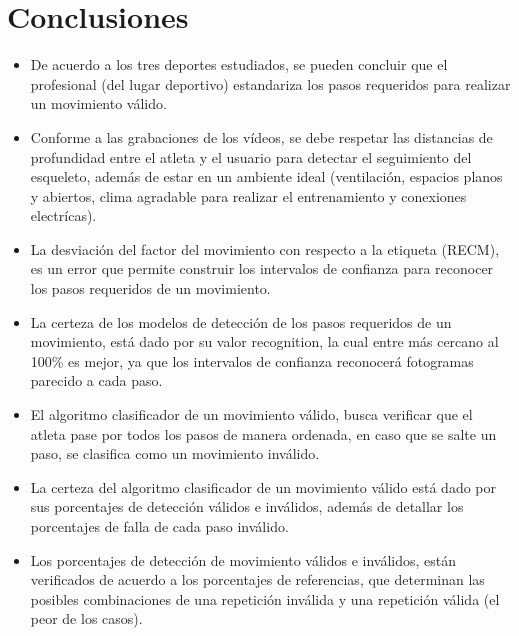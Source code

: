 \section{Conclusiones} \label{ded:con}
\begin{itemize}
\item De acuerdo a los tres deportes estudiados, se pueden concluir que el profesional (del lugar deportivo) estandariza los pasos requeridos para realizar un movimiento v\'alido.
\item Conforme a las grabaciones de los v\'ideos, se debe respetar las distancias de profundidad entre el atleta y el usuario para detectar el seguimiento del esqueleto, adem\'as de estar en un ambiente ideal (ventilaci\'on, espacios planos y  abiertos, clima agradable para realizar el entrenamiento y conexiones electr\'icas).
\item La desviaci\'on del factor del movimiento con respecto a la etiqueta (RECM), es un error que  permite construir los intervalos de confianza para reconocer los pasos requeridos de un movimiento.
\item La certeza de los modelos de detecci\'on  de los pasos requeridos de un movimiento, est\'a dado por su valor recognition, la cual entre m\'as cercano al 100\% es mejor, ya que los intervalos de confianza reconocer\'a fotogramas parecido a cada paso.
\item El algoritmo clasificador de un movimiento v\'alido, busca verificar que el atleta pase por todos los pasos de manera ordenada, en caso que se salte un paso, se clasifica como un movimiento inv\'alido.
\item La certeza del algoritmo clasificador de un movimiento v\'alido est\'a dado por sus porcentajes de detecci\'on v\'alidos e inv\'alidos, adem\'as de detallar los porcentajes de falla de cada paso inv\'alido.
\item Los porcentajes de detecci\'on de movimiento v\'alidos e inv\'alidos, est\'an verificados de acuerdo a los porcentajes de referencias, que determinan las posibles combinaciones de una repetici\'on inv\'alida y una repetici\'on v\'alida (el peor de los casos).
\end{itemize}